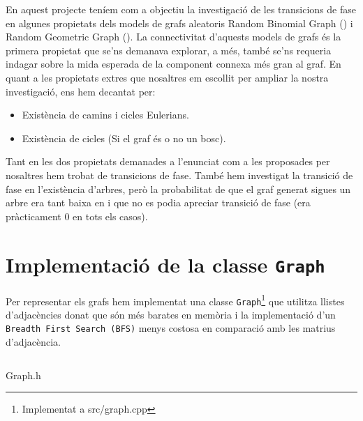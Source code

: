 En aquest projecte teníem com a objectiu la investigació de les transicions de fase en algunes propietats dels models de grafs aleatoris Random Binomial Graph (\BRG) i Random Geometric Graph (\RGG). 
La connectivitat d'aquests models de grafs és la primera propietat que se'ns demanava explorar, a més, també se'ns requeria indagar sobre la mida esperada de la component connexa més gran al graf. 
En quant a les propietats extres que nosaltres em escollit per ampliar la nostra investigació, ens hem decantat per:

\begin{itemize}
    \item Existència de camins i cicles Eulerians.
    \item Existència de cicles (Si el graf és o no un bosc).
\end{itemize}

Tant en les dos propietats demanades a l'enunciat com a les proposades per nosaltres hem trobat de transicions de fase. També hem investigat la transició de fase en l'existència d'arbres, però la probabilitat de que el graf generat sigues un
arbre era tant baixa en \BRG i \RGG que no es podia apreciar transició de fase (era pràcticament 0 en tots els casos).


\section{Implementació de la classe \texttt{Graph}}
Per representar els grafs hem implementat una classe \texttt{Graph}\footnote{Implementat a src/graph.cpp} que utilitza llistes d'adjacències donat que són més barates en memòria i la implementació d'un \texttt{Breadth First Search (BFS)} menys costosa en comparació amb les matrius d'adjacència.

\begin{listing}
\inputminted{cpp}{src/graph.h}
\caption{Graph.h}
\end{listing}

